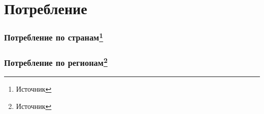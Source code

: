 \section{Потребление}

\begin{frame}
    \frametitle{Потребление по странам\footnote{Источник}}
    \begin{center}
        
    \end{center}
\end{frame}

\begin{frame}
    \frametitle{Потребление по регионам\footnote{Источник}}
    \begin{center}
        
    \end{center}
\end{frame}